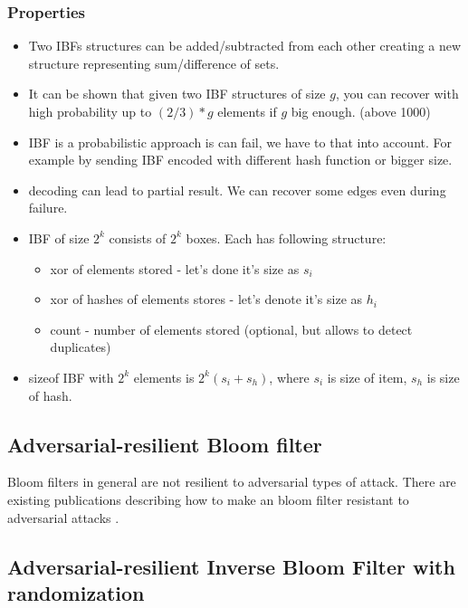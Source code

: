 \documentclass[11pt]{article}
\begin{document}
\subsubsection{Properties}
\begin{itemize}
\item Two IBFs structures can be added/subtracted from each other creating a new structure representing sum/difference of sets.
\item It can be shown that given two IBF structures of size $g$, you can recover with high probability up to $(2/3)*g$ elements if $g$ big enough. (above 1000)  \cite{esrwpc}
\item IBF is a probabilistic approach is can fail, we have to that into account.
For example by sending IBF encoded with different hash function or bigger size.
\item decoding can lead to partial result.
We can recover some edges even during failure.
\item IBF of size $2^k$ consists of $2^k$ boxes.
Each has following structure:
\begin{itemize}
\item xor of elements stored -  let's done it's size as $s_i$
\item xor of hashes of elements stores - let's denote it's size as $h_i$
\item count - number of elements stored (optional, but allows to detect duplicates)
\end{itemize}
\item sizeof IBF with $2^k$ elements is $2^k(s_i + s_h)$, where $s_i$ is size of item, $s_h$ is size of hash.
\end{itemize}


\subsection{Adversarial-resilient Bloom filter}
Bloom filters in general are not resilient to adversarial types of attack.
There are existing publications describing how to make an bloom filter resistant to adversarial attacks \cite{adversarial}.

\subsection{Adversarial-resilient Inverse Bloom Filter with randomization}
\end{document}
